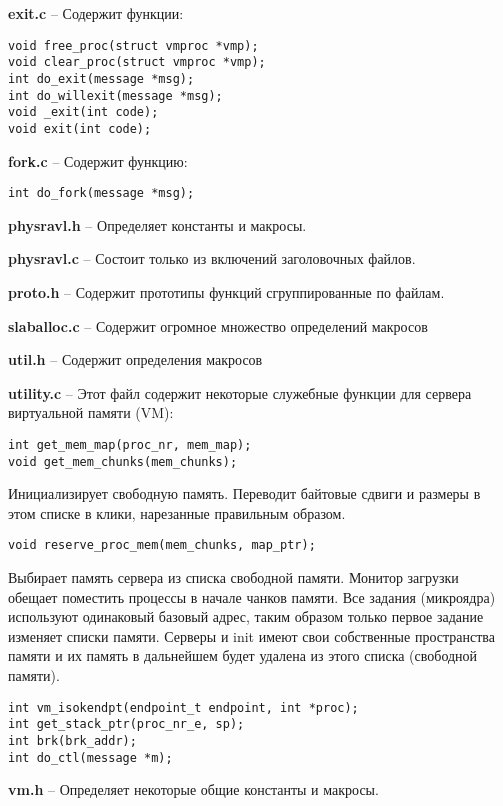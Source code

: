 \textbf{exit.c} -- Содержит функции:
\begin{Verbatim}[frame=single]
void free_proc(struct vmproc *vmp);
void clear_proc(struct vmproc *vmp);
int do_exit(message *msg);
int do_willexit(message *msg);
void _exit(int code);
void exit(int code);
\end{Verbatim}

\textbf{fork.c} -- Содержит функцию:
\begin{Verbatim}[frame=single]
int do_fork(message *msg);
\end{Verbatim}

\textbf{physravl.h} -- Определяет константы и макросы.

\textbf{physravl.c} -- Состоит только из включений заголовочных файлов.

\textbf{proto.h} -- Содержит прототипы функций сгруппированные по файлам.

\textbf{slaballoc.c} -- Содержит огромное множество определений макросов

\textbf{util.h} -- Содержит определения макросов

\textbf{utility.c} -- Этот файл содержит некоторые служебные функции для сервера виртуальной памяти (VM):
\begin{Verbatim}[frame=single]
int get_mem_map(proc_nr, mem_map);
void get_mem_chunks(mem_chunks);
\end{Verbatim}
Инициализирует свободную память.
Переводит байтовые сдвиги и размеры в этом списке в клики, нарезанные правильным образом.
\begin{Verbatim}[frame=single]
void reserve_proc_mem(mem_chunks, map_ptr);
\end{Verbatim}
Выбирает память сервера из списка свободной памяти. Монитор загрузки обещает поместить процессы в начале чанков памяти. Все задания (микроядра) используют одинаковый базовый адрес, таким образом только первое задание изменяет списки памяти. Серверы и init имеют свои собственные пространства памяти и их память в дальнейшем будет удалена из этого списка (свободной памяти).
\begin{Verbatim}[frame=single]
int vm_isokendpt(endpoint_t endpoint, int *proc);
int get_stack_ptr(proc_nr_e, sp);
int brk(brk_addr);
int do_ctl(message *m);
\end{Verbatim}

\textbf{vm.h} -- Определяет некоторые общие константы и макросы.


